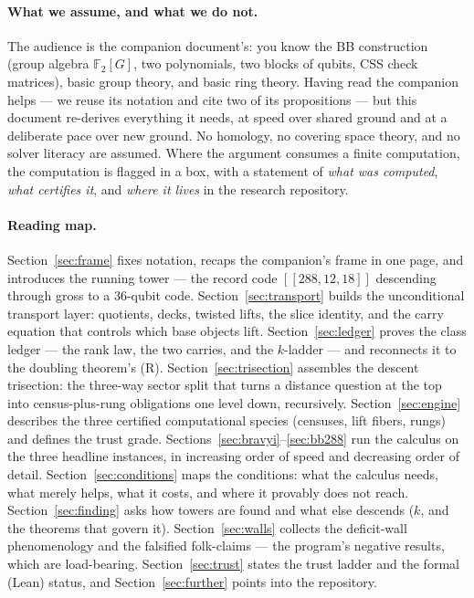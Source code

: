 \documentclass[11pt]{article}
\theoremstyle{plain}
\theoremstyle{definition}
\theoremstyle{remark}
\newcommand{\F}{\mathbb{F}}
\begin{document}
\paragraph{What we assume, and what we do not.}
The audience is the companion document's: you know the BB construction
(group algebra $\F_2[G]$, two polynomials, two blocks of qubits, CSS check
matrices), basic group theory, and basic ring theory. Having read the
companion helps --- we reuse its notation and cite two of its propositions
--- but this document re-derives everything it needs, at speed over shared
ground and at a deliberate pace over new ground. No homology, no covering
space theory, and no solver literacy are assumed. Where the argument
consumes a finite computation, the computation is flagged in a box, with a
statement of \emph{what was computed}, \emph{what certifies it}, and
\emph{where it lives} in the research repository.

\paragraph{Reading map.}
Section~\ref{sec:frame} fixes notation, recaps the companion's frame in
one page, and introduces the running tower --- the record code
$[[288,12,18]]$ descending through gross to a $36$-qubit code.
Section~\ref{sec:transport} builds the unconditional transport layer:
quotients, decks, twisted lifts, the slice identity, and the carry
equation that controls which base objects lift. Section~\ref{sec:ledger}
proves the class ledger --- the rank law, the two carries, and the
$k$-ladder --- and reconnects it to the doubling theorem's (R).
Section~\ref{sec:trisection} assembles the descent trisection: the
three-way sector split that turns a distance question at the top into
census-plus-rung obligations one level down, recursively.
Section~\ref{sec:engine} describes the three certified computational
species (censuses, lift fibers, rungs) and defines the trust grade.
Sections~\ref{sec:bravyi}--\ref{sec:bb288} run the calculus on the three
headline instances, in increasing order of speed and decreasing order of
detail. Section~\ref{sec:conditions} maps the conditions: what the
calculus needs, what merely helps, what it costs, and where it provably
does not reach. Section~\ref{sec:finding} asks how towers are found and
what else descends ($k$, and the theorems that govern it).
Section~\ref{sec:walls} collects the deficit-wall phenomenology and the
falsified folk-claims --- the program's negative results, which are
load-bearing. Section~\ref{sec:trust} states the trust ladder and the
formal (Lean) status, and Section~\ref{sec:further} points into the
repository.
\end{document}
